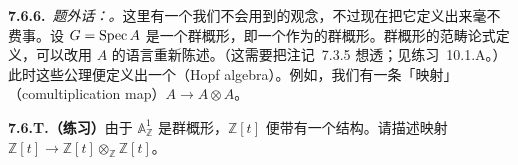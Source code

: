\textbf{7.6.6.}\ \emph{题外话：\trHopfAlgebra。}\quad 这里有一个我们不会用到的观念，不过现在把它定义出来毫不费事。设 $G=\operatorname{Spec} A$ 是一个\trAffine{}群概形，即一个作为\trAffineScheme{}的群概形。群概形的范畴论式定义，可以改用\trRing{} $A$ 的语言重新陈述。（这需要把注记~7.3.5 想透；见\mbox{练习~10.1.A}。）此时这些公理便定义出一个\textbf{\trHopfAlgebra{}}（Hopf algebra）。例如，我们有一条「\trComultiplication{}映射」（comultiplication map）$A\to A\otimes A$。

\textbf{7.6.T.（练习）}\quad 由于 $\mathbb{A}^1_{\mathbb{Z}}$ 是群概形，$\mathbb{Z}[t]$ 便带有一个\trHopfAlgebra{}结构。请描述\trComultiplication{}映射 $\mathbb{Z}[t]\to\mathbb{Z}[t]\otimes_{\mathbb{Z}}\mathbb{Z}[t]$。
